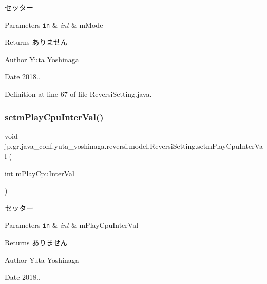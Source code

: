 セッター 


\begin{DoxyParams}[1]{Parameters}
\mbox{\tt in}  & {\em int} & m\+Mode \\
\hline
\end{DoxyParams}
\begin{DoxyReturn}{Returns}
ありません 
\end{DoxyReturn}
\begin{DoxyAuthor}{Author}
Yuta Yoshinaga 
\end{DoxyAuthor}
\begin{DoxyDate}{Date}
2018.. 
\end{DoxyDate}


Definition at line 67 of file Reversi\+Setting.\+java.

\mbox{\label{classjp_1_1gr_1_1java__conf_1_1yuta__yoshinaga_1_1reversi_1_1model_1_1_reversi_setting_ae2c0f9f922618dfaf5da9050362dcb2d}} 
\subsubsection{\texorpdfstring{setm\+Play\+Cpu\+Inter\+Val()}{setmPlayCpuInterVal()}}
{\footnotesize\ttfamily void jp.\+gr.\+java\+\_\+conf.\+yuta\+\_\+yoshinaga.\+reversi.\+model.\+Reversi\+Setting.\+setm\+Play\+Cpu\+Inter\+Val (\begin{DoxyParamCaption}\item[{int}]{m\+Play\+Cpu\+Inter\+Val }\end{DoxyParamCaption})}



セッター 


\begin{DoxyParams}[1]{Parameters}
\mbox{\tt in}  & {\em int} & m\+Play\+Cpu\+Inter\+Val \\
\hline
\end{DoxyParams}
\begin{DoxyReturn}{Returns}
ありません 
\end{DoxyReturn}
\begin{DoxyAuthor}{Author}
Yuta Yoshinaga 
\end{DoxyAuthor}
\begin{DoxyDate}{Date}
2018.. 
\end{DoxyDate}


